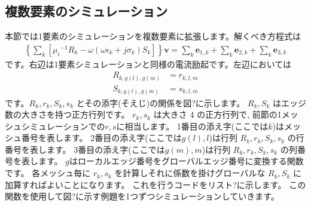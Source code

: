 \subsection{複数要素のシミュレーション}

本節では1要素のシミュレーションを複数要素に拡張します。解くべき方程式は
\begin{align}
\left\{
\sum_k
\left[
{\mu_i}^{-1} R_k
-\omega\left(\omega\epsilon_k+j\sigma_k\right)S_k
\right]
\right\}
\textbf{v}
=\sum_k \textbf{e}_{1,k}+\sum_k\textbf{e}_{2,k}+\sum_k\textbf{e}_{3,k}
\end{align}
です。右辺は1要素シミュレーションと同様の電流励起です。左辺においては
\begin{align}
R_{k,g(l),g(m)} &= r_{k,l,m}\\
S_{k,g(l),g(m)} &= s_{k,l,m}
\end{align}
です。$R_k, r_k, S_k, s_k$ とその添字(そえじ)の関係を図?に示します。
$R_k, S_k$ はエッジ数の大きさを持つ正方行列です。
$r_k, s_k$ は大きさ 4 の正方行列で,
前節の1メッシュシミュレーションでの$r, s$に相当します。
1番目の添え字(ここでは$k$)はメッシュ番号を表します。
2番目の添え字(ここでは$g(l), l$)は行列
$R_k, r_k, S_k, s_k$ の行番号を表します。
3番目の添え字(ここでは$g(m), m$)は行列
$R_k, r_k, S_k, s_k$ の列番号を表します。
$g$はローカルエッジ番号をグローバルエッジ番号に変換する関数です。
各メッシュ毎に $r_k, s_k$ を計算しそれに係数を掛けグローバルな
$R_k, S_k$ に加算すればよいことになります。
これを行うコードをリスト?に示します。
この関数を使用して図?に示す例題を1つずつシミュレーションしていきます。
